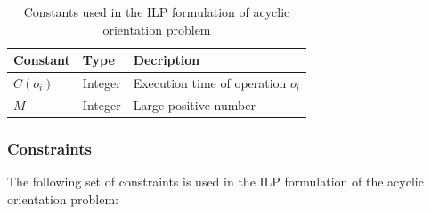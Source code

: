\begin{table}[!htbp]
\caption{Constants used in the ILP formulation of acyclic orientation problem}
\centering
\label{table:consilporient}
\begin{tabular}{l l l}
\toprule
Constant & Type & Decription\\
\midrule
 $C(o_i)$ & Integer & Execution time of operation $o_i$\\
 $M$ & Integer & Large positive number\\
\bottomrule
\end{tabular}
\end{table}

\subsubsection{Constraints}

The following set of constraints is used in the ILP formulation of the acyclic orientation problem:

